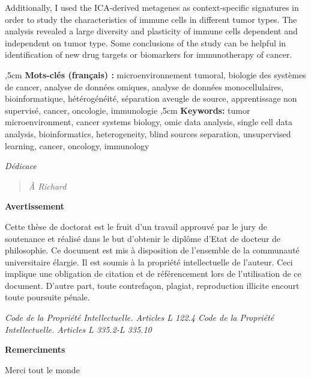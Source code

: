\documentclass[12pt,]{book}
\theoremstyle{definition}
\theoremstyle{definition}
\theoremstyle{definition}
\theoremstyle{remark}
\begin{document}
\begin{titlepage}
Additionally, I used the ICA-derived metagenes as context-specific signatures in order to study the characteristics of immune cells in different tumor types. The analysis revealed a large diversity and plasticity of immune cells dependent and independent on tumor type. Some conclusions of the study can be helpful in identification of new drug targets or biomarkers for immunotherapy of cancer.

,5cm
\noindent
\textbf{Mots-clés (français) :} microenvironnement tumoral, biologie des systèmes de cancer, analyse de données omiques, analyse de données monocellulaires, bioinformatique, hétérogénéité,  séparation aveugle de source, apprentissage non supervisé, cancer, oncologie, immunologie
,5cm
\noindent
\textbf{Keywords:} tumor microenvironment, cancer systems biology, omic data analysis, single cell data analysis, bioinformatics, heterogeneity, blind sources separation, unsupervised learning, cancer, oncology, immunology


\newpage
\emph{Dédicace}
\vspace*{\fill}

\begin{quote}

\large{\centerline{\textit{À Richard}}}
 \end{quote}
 \vspace*{\fill}




\newpage
\thispagestyle{empty}
\begin{center}
\large{\textbf{Avertissement}}
\end{center}
\vspace{2cm}
Cette thèse de doctorat est le fruit d’un travail approuvé par le jury de soutenance et
réalisé dans le but d’obtenir le diplôme d’Etat de docteur de philosophie. Ce document
est mis à disposition de l’ensemble de la communauté universitaire élargie.
Il est soumis à la propriété intellectuelle de l’auteur. Ceci implique une obligation de
citation et de référencement lors de l’utilisation de ce document.
D’autre part, toute contrefaçon, plagiat, reproduction illicite encourt toute poursuite
pénale.
\vspace*{\fill}

\emph{Code de la Propriété Intellectuelle. Articles L 122.4 \newline
Code de la Propriété Intellectuelle. Articles L 335.2-L 335.10}


\newpage
\thispagestyle{empty}
\begin{center}
\large{\textbf{Remerciments}}
\end{center}
\vspace{2cm}
Merci tout le monde

\end{titlepage}
\end{document}
